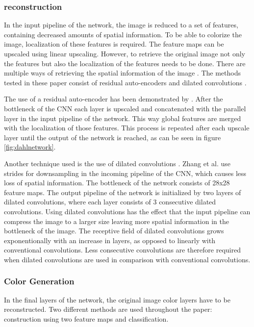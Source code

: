 \subsubsection{reconstruction}
In the input pipeline of the network, the image is reduced to a set of features, containing decreased amounts of spatial information. To be able to colorize the image, localization of these features is required. The feature maps can be upscaled using linear upscaling. However, to retrieve the original image not only the features but also the localization of the features needs to be done. There are multiple ways of retrieving the spatial information of the image \cite{Charpiat} \cite{Zhang}. The methods tested in these paper consist of residual auto-encoders and dilated convolutions \cite{yu2015multi}.

The use of a residual auto-encoder has been demonstrated by \cite{Dahl}. After the bottleneck of the CNN each layer is upscaled and concatenated with the parallel layer in the input pipeline of the network. This way global features are merged with the localization of those features. This process is repeated after each upscale layer until the output of the network is reached, as can be seen in figure \ref{fig:dahlnetwork}.

%
Another technique used is the use of dilated convolutions \cite{yu2015multi}. Zhang et al. use strides for downsampling in the incoming pipeline of the CNN, which causes less loss of spatial information. The bottleneck of the network consists of 28x28 feature maps. The output pipeline of the network is initialized by two layers of dilated convolutions, where each layer consists of 3 consecutive dilated convolutions. Using dilated convolutions has the effect that the input pipeline can compress the image to a larger size leaving more spatial information in the bottleneck of the image. The receptive field of dilated convolutions grows exponentionally with an increase in layers, as opposed to linearly with conventional convolutions. Less consecutive convolutions are therefore required when dilated convolutions are used in comparison with conventional convolutions.\\


\subsubsection{Color Generation}
In the final layers of the network, the original image color layers have to be reconstructed. Two different methods are used throughout the paper: construction using two feature maps and classification.


